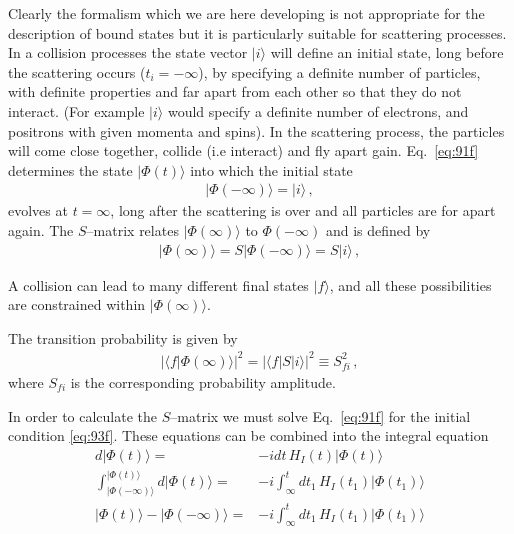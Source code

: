 Clearly the formalism which we are here developing is not appropriate for the description of bound states but it is particularly suitable for scattering processes. In a collision processes the state vector $|i\rangle$ will define an initial state, long before the scattering occurs ($t_i=-\infty$), by specifying a definite number of particles, with definite properties and far apart from each other so that they do not interact. (For example $|i\rangle$ would specify a definite number of electrons, and positrons with given momenta and spins). In the scattering process, the particles will come close together, collide (i.e interact) and fly apart gain. Eq.~\eqref{eq:91f} determines the state $|\Phi(t)\rangle$ into which the initial state
\begin{align}
  |\Phi(-\infty)\rangle=|i\rangle\,,
\end{align}
evolves at $t=\infty$, long after the scattering is over and all particles are for apart again. The $S$--matrix relates $|\Phi(\infty)\rangle$ to $\Phi(-\infty)$ and is defined by
\begin{align}
  |\Phi(\infty)\rangle=S|\Phi(-\infty)\rangle=S|i\rangle\,,
\end{align}

A collision can lead to many different final states $|f\rangle$, and all these possibilities are constrained within $|\Phi(\infty)\rangle$.

The transition probability is given by
\begin{align}
  \left|\langle f|\Phi(\infty)\rangle\right|^2=  \left|\langle f|S|i\rangle\right|^2\equiv S_{f i}^2\,,
\end{align}
where $S_{f i}$ is the corresponding probability amplitude.

In order to calculate the $S$--matrix we must solve Eq.~\eqref{eq:91f} for the initial condition \eqref{eq:93f}. These equations can be combined into the integral equation
\begin{align}
 d |\Phi(t)\rangle=&-i d t\,H_I(t)|\Phi(t)\rangle\nonumber\\
\int_{|\Phi(-\infty)\rangle}^{|\Phi(t)\rangle} d |\Phi(t)\rangle=&-i \int_\infty^t d t_1\,H_I(t_1)|\Phi(t_1)\rangle\nonumber\\
|\Phi(t)\rangle-|\Phi(-\infty)\rangle=&-i \int_\infty^t d t_1\,H_I(t_1)|\Phi(t_1)\rangle\nonumber\\
\end{align}

